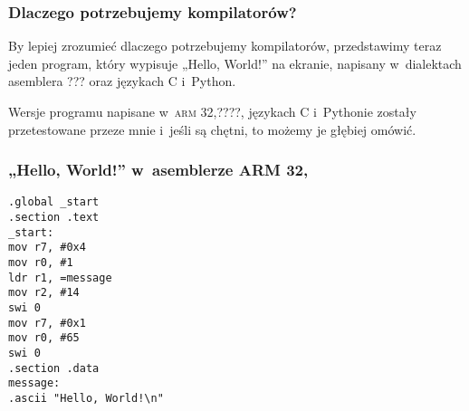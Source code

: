 \documentclass[10pt,t]{beamer}
\begin{document}
\begin{frame}
  \frametitle{Dlaczego potrzebujemy kompilatorów?}


  By lepiej zrozumieć dlaczego potrzebujemy kompilatorów, przedstawimy
  teraz jeden program, który wypisuje „Hello, World!” na ekranie, napisany
  w~dialektach asemblera ??? oraz językach C i~Python.

  Wersje programu napisane w~\textsc{arm} 32,????, językach C i~Pythonie
  zostały przetestowane przeze mnie i~jeśli są chętni, to możemy je głębiej
  omówić.

\end{frame}





\begin{frame}
  \frametitle{„Hello, World!” w~asemblerze ARM 32,
    \parencite{Low-Level-Learning-You-Can-Learn-ARM-ETC-Ver-2020}}


  \texttt{.global \_start} \\
  \texttt{.section .text} \\



  \texttt{\_start:} \\[-0.2em]
  \hphantom{aaaaaaaa} \texttt{mov r7, \#0x4} \\
  \hphantom{aaaaaaaa} \texttt{mov r0, \#1} \\
  \hphantom{aaaaaaaa} \texttt{ldr r1, =message} \\
  \hphantom{aaaaaaaa} \texttt{mov r2, \#14} \\

  \hphantom{aaaaaaaa} \texttt{swi 0} \\

  \hphantom{aaaaaaaa} \texttt{mov r7, \#0x1} \\
  \hphantom{aaaaaaaa} \texttt{mov r0, \#65} \\

  \hphantom{aaaaaaaa} \texttt{swi 0} \\



  \texttt{.section .data} \\
  \texttt{message:} \\
  \hphantom{aaaaaaaa} \texttt{.ascii "Hello, World!\textbackslash n"}

\end{frame}
\end{document}
